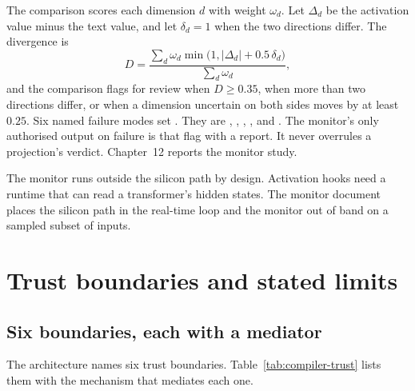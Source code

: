 The comparison scores each dimension $d$ with weight $\omega_d$. Let $\Delta_d$ be the activation
value minus the text value, and let $\delta_d = 1$ when the two directions differ. The divergence is
\begin{equation}
D = \frac{\sum_d \omega_d \min\bigl(1, |\Delta_d| + 0.5\,\delta_d\bigr)}{\sum_d \omega_d},
\label{eq:compiler-divergence}
\end{equation}
and the comparison flags for review when $D \geq 0.35$, when more than two directions differ, or
when a dimension uncertain on both sides moves by at least $0.25$. Six named failure modes set
. They are ,
, , ,
 and . The monitor's only authorised output on
failure is that flag with a report. It never overrules a projection's verdict. Chapter~12 reports
the monitor study.

The monitor runs outside the silicon path by design. Activation hooks need a runtime that can read
a transformer's hidden states. The monitor document places the silicon path in the real-time loop
and the monitor out of band on a sampled subset of inputs.

\section{Trust boundaries and stated limits}\label{sec:compiler-boundaries}

\subsection{Six boundaries, each with a mediator}

The architecture names six trust boundaries. Table~\ref{tab:compiler-trust} lists them with the
mechanism that mediates each one.

